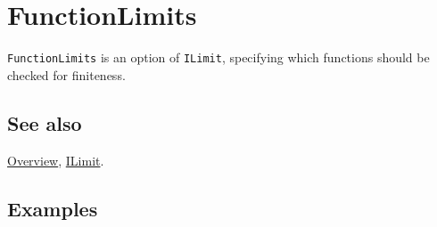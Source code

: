\documentclass[../FeynCalcManual.tex]{subfiles}
\begin{document}
\hypertarget{functionlimits}{
\section{FunctionLimits}\label{functionlimits}}

\texttt{FunctionLimits} is an option of \texttt{ILimit}, specifying
which functions should be checked for finiteness.

\subsection{See also}

\hyperlink{toc}{Overview}, \hyperlink{ilimit}{ILimit}.

\subsection{Examples}
\end{document}
